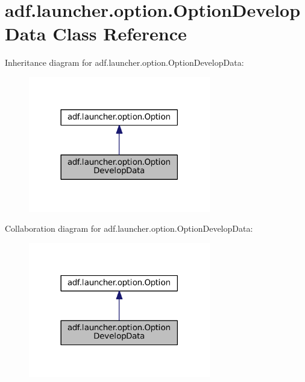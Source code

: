 \hypertarget{classadf_1_1launcher_1_1option_1_1OptionDevelopData}{}\section{adf.\+launcher.\+option.\+Option\+Develop\+Data Class Reference}
\label{classadf_1_1launcher_1_1option_1_1OptionDevelopData}


Inheritance diagram for adf.\+launcher.\+option.\+Option\+Develop\+Data\+:
\nopagebreak
\begin{figure}[H]
\begin{center}
\leavevmode
\includegraphics[width=225pt]{classadf_1_1launcher_1_1option_1_1OptionDevelopData__inherit__graph}
\end{center}
\end{figure}


Collaboration diagram for adf.\+launcher.\+option.\+Option\+Develop\+Data\+:
\nopagebreak
\begin{figure}[H]
\begin{center}
\leavevmode
\includegraphics[width=225pt]{classadf_1_1launcher_1_1option_1_1OptionDevelopData__coll__graph}
\end{center}
\end{figure}
